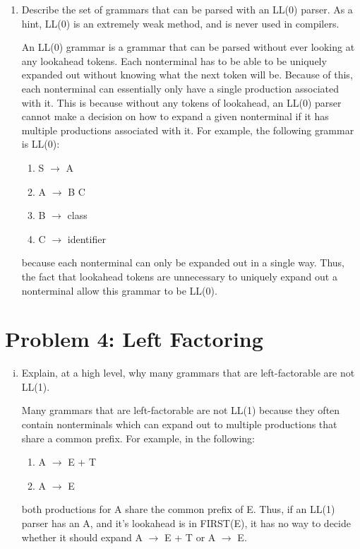 \documentclass{article}
\begin{document}
\begin{enumerate}
	\item Describe the set of grammars that can be parsed with an LL(0)
		parser. As a hint, LL(0) is an extremely weak method, and is
		never used in compilers.

		An LL(0) grammar is a grammar that can be parsed without ever
		looking at any lookahead tokens. Each nonterminal has to be
		able to be uniquely expanded out without knowing what the next
		token will be. Because of this, each nonterminal can
		essentially only have a single production associated with it.
		This is because without any tokens of lookahead, an LL(0) parser
		cannot make a decision on how to expand a given nonterminal if
		it has multiple productions associated with it. For example, the
		following grammar is LL(0):
		\begin{enumerate}[(1)]
			\item S $\to$ A
			\item A $\to$ B C
			\item B $\to$ class
			\item C $\to$ identifier
		\end{enumerate}
		because each nonterminal can only be expanded out in a single
		way. Thus, the fact that lookahead tokens are unnecessary to
		uniquely expand out a nonterminal allow this grammar to be
		LL(0).
\end{enumerate}

\section{Problem 4: Left Factoring}

\begin{enumerate}[i.]
	\item Explain, at a high level, why many grammars that are
		left-factorable are not LL(1).

		Many grammars that are left-factorable are not LL(1) because
		they often contain nonterminals which can expand out to multiple
		productions that share a common prefix. For example, in the
		following:
		\begin{enumerate}[(1)]
			\item A $\to$ E + T
			\item A $\to$ E
		\end{enumerate}
		both productions for A share the common prefix of E. Thus, if
		an LL(1) parser has an A, and it's lookahead is in FIRST(E),
		it has no way to decide whether it should expand A $\to$ E + T
		or A $\to$ E.
\end{enumerate}
\end{document}
